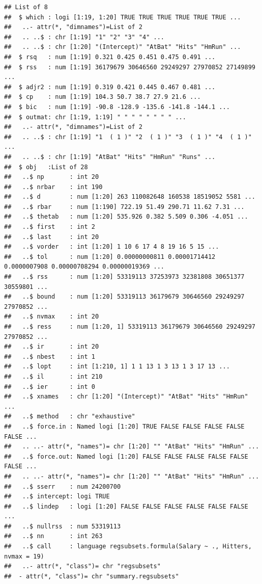 \documentclass[
  12pt,
]{book}
\begin{document}
\begin{verbatim}
## List of 8
##  $ which : logi [1:19, 1:20] TRUE TRUE TRUE TRUE TRUE TRUE ...
##   ..- attr(*, "dimnames")=List of 2
##   .. ..$ : chr [1:19] "1" "2" "3" "4" ...
##   .. ..$ : chr [1:20] "(Intercept)" "AtBat" "Hits" "HmRun" ...
##  $ rsq   : num [1:19] 0.321 0.425 0.451 0.475 0.491 ...
##  $ rss   : num [1:19] 36179679 30646560 29249297 27970852 27149899 ...
##  $ adjr2 : num [1:19] 0.319 0.421 0.445 0.467 0.481 ...
##  $ cp    : num [1:19] 104.3 50.7 38.7 27.9 21.6 ...
##  $ bic   : num [1:19] -90.8 -128.9 -135.6 -141.8 -144.1 ...
##  $ outmat: chr [1:19, 1:19] " " " " " " " " ...
##   ..- attr(*, "dimnames")=List of 2
##   .. ..$ : chr [1:19] "1  ( 1 )" "2  ( 1 )" "3  ( 1 )" "4  ( 1 )" ...
##   .. ..$ : chr [1:19] "AtBat" "Hits" "HmRun" "Runs" ...
##  $ obj   :List of 28
##   ..$ np       : int 20
##   ..$ nrbar    : int 190
##   ..$ d        : num [1:20] 263 110082648 160538 18519052 5581 ...
##   ..$ rbar     : num [1:190] 722.19 51.49 290.71 11.62 7.31 ...
##   ..$ thetab   : num [1:20] 535.926 0.382 5.509 0.306 -4.051 ...
##   ..$ first    : int 2
##   ..$ last     : int 20
##   ..$ vorder   : int [1:20] 1 10 6 17 4 8 19 16 5 15 ...
##   ..$ tol      : num [1:20] 0.00000000811 0.00001714412 0.0000007908 0.00000708294 0.00000019369 ...
##   ..$ rss      : num [1:20] 53319113 37253973 32381808 30651377 30559801 ...
##   ..$ bound    : num [1:20] 53319113 36179679 30646560 29249297 27970852 ...
##   ..$ nvmax    : int 20
##   ..$ ress     : num [1:20, 1] 53319113 36179679 30646560 29249297 27970852 ...
##   ..$ ir       : int 20
##   ..$ nbest    : int 1
##   ..$ lopt     : int [1:210, 1] 1 1 13 1 3 13 1 3 17 13 ...
##   ..$ il       : int 210
##   ..$ ier      : int 0
##   ..$ xnames   : chr [1:20] "(Intercept)" "AtBat" "Hits" "HmRun" ...
##   ..$ method   : chr "exhaustive"
##   ..$ force.in : Named logi [1:20] TRUE FALSE FALSE FALSE FALSE FALSE ...
##   .. ..- attr(*, "names")= chr [1:20] "" "AtBat" "Hits" "HmRun" ...
##   ..$ force.out: Named logi [1:20] FALSE FALSE FALSE FALSE FALSE FALSE ...
##   .. ..- attr(*, "names")= chr [1:20] "" "AtBat" "Hits" "HmRun" ...
##   ..$ sserr    : num 24200700
##   ..$ intercept: logi TRUE
##   ..$ lindep   : logi [1:20] FALSE FALSE FALSE FALSE FALSE FALSE ...
##   ..$ nullrss  : num 53319113
##   ..$ nn       : int 263
##   ..$ call     : language regsubsets.formula(Salary ~ ., Hitters, nvmax = 19)
##   ..- attr(*, "class")= chr "regsubsets"
##  - attr(*, "class")= chr "summary.regsubsets"
\end{verbatim}
\end{document}
